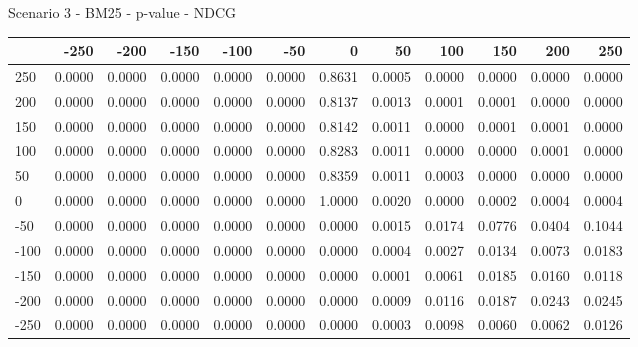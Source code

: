 Scenario 3 - BM25 - p-value - NDCG
\begin{tabular}{lrrrrrrrrrrr}
\toprule
{} &   -250 &   -200 &   -150 &   -100 &   -50  &    0   &    50  &    100 &    150 &    200 &    250 \\
\midrule
 250 & 0.0000 & 0.0000 & 0.0000 & 0.0000 & 0.0000 & 0.8631 & 0.0005 & 0.0000 & 0.0000 & 0.0000 & 0.0000 \\
 200 & 0.0000 & 0.0000 & 0.0000 & 0.0000 & 0.0000 & 0.8137 & 0.0013 & 0.0001 & 0.0001 & 0.0000 & 0.0000 \\
 150 & 0.0000 & 0.0000 & 0.0000 & 0.0000 & 0.0000 & 0.8142 & 0.0011 & 0.0000 & 0.0001 & 0.0001 & 0.0000 \\
 100 & 0.0000 & 0.0000 & 0.0000 & 0.0000 & 0.0000 & 0.8283 & 0.0011 & 0.0000 & 0.0000 & 0.0001 & 0.0000 \\
 50  & 0.0000 & 0.0000 & 0.0000 & 0.0000 & 0.0000 & 0.8359 & 0.0011 & 0.0003 & 0.0000 & 0.0000 & 0.0000 \\
 0   & 0.0000 & 0.0000 & 0.0000 & 0.0000 & 0.0000 & 1.0000 & 0.0020 & 0.0000 & 0.0002 & 0.0004 & 0.0004 \\
-50  & 0.0000 & 0.0000 & 0.0000 & 0.0000 & 0.0000 & 0.0000 & 0.0015 & 0.0174 & 0.0776 & 0.0404 & 0.1044 \\
-100 & 0.0000 & 0.0000 & 0.0000 & 0.0000 & 0.0000 & 0.0000 & 0.0004 & 0.0027 & 0.0134 & 0.0073 & 0.0183 \\
-150 & 0.0000 & 0.0000 & 0.0000 & 0.0000 & 0.0000 & 0.0000 & 0.0001 & 0.0061 & 0.0185 & 0.0160 & 0.0118 \\
-200 & 0.0000 & 0.0000 & 0.0000 & 0.0000 & 0.0000 & 0.0000 & 0.0009 & 0.0116 & 0.0187 & 0.0243 & 0.0245 \\
-250 & 0.0000 & 0.0000 & 0.0000 & 0.0000 & 0.0000 & 0.0000 & 0.0003 & 0.0098 & 0.0060 & 0.0062 & 0.0126 \\
\bottomrule
\end{tabular}

